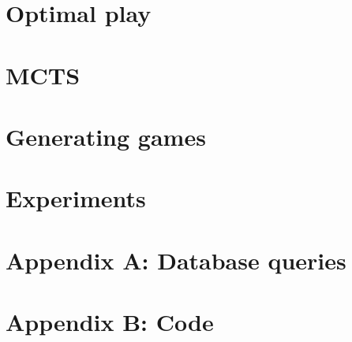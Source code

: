 \documentclass[12pt]{article}
\begin{document}
\section{Optimal play}
\label{sec:optimal_play}


\section{MCTS}
\label{sec:mcts}


\section{Generating games}
\label{sec:generating_games}


\section{Experiments}
\label{sec:experiments}

\pagebreak
% 



\pagebreak
\section{Appendix A: Database queries}
\label{sec:database_queries}

\pagebreak
\section{Appendix B: Code}
\label{sec:code}

\end{document}
